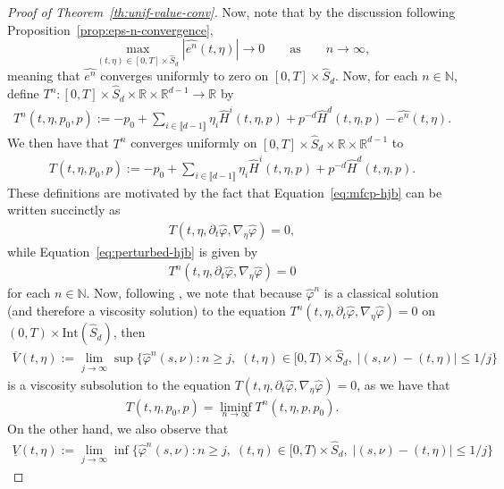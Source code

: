 \documentclass[11pt,reqno]{amsart}
\numberwithin{equation}{section}
\theoremstyle{plain}
\newcommand{\R}{\mathbb{R}}
\newcommand{\N}{\mathbb{N}}
\newcommand{\lbrs}[1]{\llbracket #1 \rrbracket}
\newcommand{\intr}{\text{Int}}
\begin{document}
\begin{proof}[Proof of Theorem~\ref{th:unif-value-conv}]
Now, note that by the discussion following Proposition~\ref{prop:eps-n-convergence},
$$\max_{(t,\eta) \in [0,T] \times \widehat{S}_d}\left|\widehat{e^n}(t,\eta)\right| \to 0\qquad \text{as}\qquad n\to\infty,$$
meaning that $\widehat{e^n}$ converges uniformly to zero on $[0,T] \times \widehat{S}_d$. Now, for each $n \in \N$, define $T^n : [0,T] \times \widehat{S}_d \times \R \times \R^{d-1} \to \R$ by
\begin{align*}
    T^n(t, \eta, p_0, p) := -p_0 + \sum_{i \in \lbrs{d-1}} \eta_i \widehat{H}^i(t, \eta, p) + p^{-d} \widehat{H}^d (t,\eta,p) - \widehat{e^n}(t, \eta).
\end{align*}
We then have that $T^n$ converges uniformly on $[0,T] \times \widehat{S}_d \times \R \times \R^{d-1}$ to
\begin{align*}
    T(t,\eta,p_0, p) := -p_0 + \sum_{i \in \lbrs{d-1}} \eta_i \widehat{H}^i(t, \eta, p) + p^{-d} \widehat{H}^d (t,\eta,p).
\end{align*}
These definitions are motivated by the fact that Equation~\eqref{eq:mfcp-hjb} can be written succinctly as
\begin{align*}
    T(t,\eta, \partial_t \widehat{\varphi}, \nabla_\eta \widehat{\varphi}) = 0,
\end{align*}
while Equation~\eqref{eq:perturbed-hjb} is given by
\begin{align*}
    T^n(t,\eta, \partial_t \widehat{\varphi}, \nabla_\eta \widehat{\varphi}) = 0
\end{align*}
for each $n \in \N$. Now, following \cite[Remark 6.3]{visc-users}, we note that because $\widehat{\varphi}^n$ is a classical solution (and therefore a viscosity solution) to the equation $T^n(t,\eta, \partial_t \widehat{\varphi}, \nabla_\eta \widehat{\varphi}) = 0$ on $(0,T) \times \intr(\widehat{S}_d)$, then 
\begin{align*}
    \overline{V}(t, \eta) := \lim_{j \to \infty} \sup\{\widehat{\varphi}^n(s, \nu) : n \geq j, \; (t, \eta) \in [0,T) \times \widehat{S}_d, \; |(s, \nu) - (t, \eta)| \leq 1/j\}
\end{align*}
is a viscosity subsolution to the equation $T(t,\eta, \partial_t \widehat{\varphi}, \nabla_\eta \widehat{\varphi}) = 0$, as we have that
\begin{align*}
    T(t,\eta,p_0,p) = \liminf_{n \to \infty} T^n(t,\eta,p,p_0).
\end{align*}
On the other hand, we also observe that 
\begin{align*}
    \underline{V}(t, \eta) := \lim_{j \to \infty} \inf\{\widehat{\varphi}^n(s,\nu) : n \geq j, \; (t, \eta) \in [0,T) \times \widehat{S}_d, \; |(s, \nu) - (t,\eta)| \leq 1/j\}

\end{align*}
\end{proof}
\end{document}
